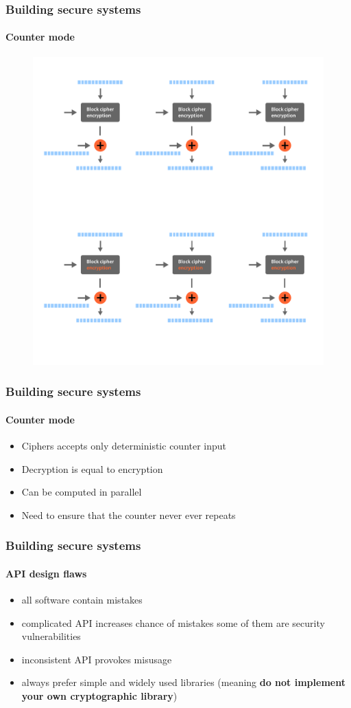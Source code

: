 \documentclass[11pt,t]{beamer}
\begin{document}
\begin{frame}[fragile]
\frametitle{Building secure systems}
\framesubtitle{Counter mode}
\begin{figure}[H]
\includegraphics[height=0.85\textheight]{ctr.pdf}
\end{figure}
\end{frame}

\begin{frame}
\frametitle{Building secure systems}
\framesubtitle{Counter mode}
\begin{itemize}
\item Ciphers accepts only deterministic counter input
\item Decryption is equal to encryption
\item Can be computed in parallel
\item Need to ensure that the counter never ever repeats
\end{itemize}
\end{frame}

\begin{frame}
\frametitle{Building secure systems}
\framesubtitle{API design flaws}
\begin{itemize}
\item<1-> all software contain mistakes
\item<2-> complicated API increases chance of mistakes some of them are security 
vulnerabilities
\item<3-> inconsistent API provokes misusage
\item<4-> always prefer simple and widely used libraries (meaning \textbf{do not 
implement your own cryptographic library})
\end{itemize}
\end{frame}
\end{document}
